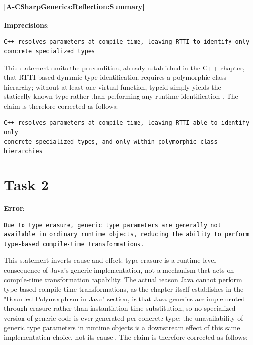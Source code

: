 \documentclass[11pt]{report}
\begin{document}
\subsubsection*{\hyperref[A-CSharpGenerics:Reflection:Summary]{\ref*{A-CSharpGenerics:Reflection:Summary} }}
\noindent\textbf{Imprecisions}:

\begin{Verbatim}[breaklines=true]
C++ resolves parameters at compile time, leaving RTTI to identify only
concrete specialized types
\end{Verbatim}

This statement omits the precondition, already established in the C++
chapter, that RTTI-based dynamic type identification requires a
polymorphic class hierarchy; without at least one virtual function, typeid
simply yields the statically known type rather than performing any runtime
identification \cite{cppreference}. The claim is therefore corrected as
follows:

\begin{Verbatim}[breaklines=true]
C++ resolves parameters at compile time, leaving RTTI able to identify only
concrete specialized types, and only within polymorphic class hierarchies
\end{Verbatim}


\chapter{Task 2}
\noindent\textbf{Error}:

\begin{Verbatim}[breaklines=true]
Due to type erasure, generic type parameters are generally not
available in ordinary runtime objects, reducing the ability to perform
type-based compile-time transformations.
\end{Verbatim}

This statement inverts cause and effect: type erasure is a runtime-level
consequence of Java's generic implementation, not a mechanism that acts on
compile-time transformation capability. The actual reason Java cannot
perform type-based compile-time transformations, as the chapter itself
establishes in the "Bounded Polymorphism in Java" section, is that Java
generics are implemented through erasure rather than instantiation-time
substitution, so no specialized version of generic code is ever generated
per concrete type; the unavailability of generic type parameters in
runtime objects is a downstream effect of this same implementation choice,
not its cause \cite{bracha2004}. The claim is therefore corrected as
follows:
\end{document}
